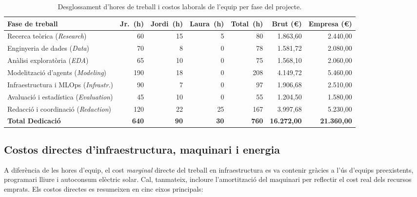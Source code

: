 \begin{table}[htbp]
    \centering
    \caption{Desglossament d'hores de treball i costos laborals de l'equip per fase del projecte.}
    \label{tab:costos_personal}
    \small
    \setlength{\tabcolsep}{4pt}
    \begin{tabularx}{\textwidth}{>{\raggedright\arraybackslash}X rrrrrr}
        \toprule
        \textbf{Fase de treball} & \textbf{Jr.~(h)} & \textbf{Jordi~(h)} & \textbf{Laura~(h)} & \textbf{Total~(h)} & \textbf{Brut (€)} & \textbf{Empresa (€)} \\
        \midrule
        Recerca teòrica (\emph{Research})           & 60  & 15 & 5  & 80  & 1.863,60  & 2.440,00  \\
        Enginyeria de dades (\emph{Data})          & 70  & 8  & 0  & 78  & 1.581,72  & 2.080,00  \\
        Anàlisi exploratòria (\emph{EDA})          & 65  & 10 & 0  & 75  & 1.568,10  & 2.060,00  \\
        Modelització d'agents (\emph{Modeling})    & 190 & 18 & 0  & 208 & 4.149,72  & 5.460,00  \\
        Infraestructura i MLOps (\emph{Infrastr.}) & 90  & 7  & 0  & 97  & 1.906,68  & 2.510,00  \\
        Avaluació i estadística (\emph{Evaluation})& 45  & 10 & 0  & 55  & 1.204,50  & 1.580,00  \\
        Redacció i coordinació (\emph{Redaction})  & 120 & 22 & 25 & 167 & 3.997,68  & 5.230,00  \\
        \midrule
        \textbf{Total Dedicació}                   & \textbf{640} & \textbf{90} & \textbf{30} & \textbf{760} & \textbf{16.272,00} & \textbf{21.360,00} \\
        \bottomrule
    \end{tabularx}
\end{table}

\subsection{Costos directes d'infraestructura, maquinari i energia}
\label{subsec:costos_materials}

A diferència de les hores d'equip, el cost \emph{marginal} directe del treball en infraestructura es va contenir gràcies a l'ús d'equips preexistents, programari lliure i autoconsum elèctric solar. Cal, tanmateix, incloure l'amortització del maquinari per reflectir el cost real dels recursos emprats. Els costos directes es resumeixen en cinc eixos principals:

